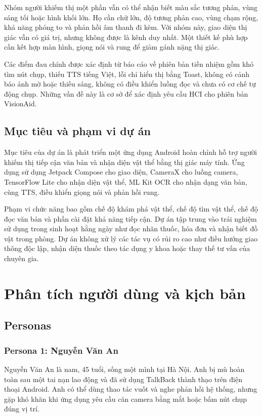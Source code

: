\documentclass[a4paper,13pt]{report}
\begin{document}
Nhóm người khiếm thị một phần vẫn có thể nhận biết màu sắc tương phản, vùng sáng tối hoặc hình khối lớn. Họ cần chữ lớn, độ tương phản cao, vùng chạm rộng, khả năng phóng to và phản hồi âm thanh đi kèm. Với nhóm này, giao diện thị giác vẫn có giá trị, nhưng không được là kênh duy nhất. Một thiết kế phù hợp cần kết hợp màn hình, giọng nói và rung để giảm gánh nặng thị giác.

Các điểm đau chính được xác định từ báo cáo về phiên bản tiền nhiệm gồm khó tìm nút chụp, thiếu TTS tiếng Việt, lỗi chỉ hiển thị bằng Toast, không có cảnh báo ảnh mờ hoặc thiếu sáng, không có điều khiển luồng đọc và chưa có cơ chế tự động chụp. Những vấn đề này là cơ sở để xác định yêu cầu HCI cho phiên bản VisionAid.

\section{Mục tiêu và phạm vi dự án}

Mục tiêu của dự án là phát triển một ứng dụng Android hoàn chỉnh hỗ trợ người khiếm thị tiếp cận văn bản và nhận diện vật thể bằng thị giác máy tính. Ứng dụng sử dụng Jetpack Compose cho giao diện, CameraX cho luồng camera, TensorFlow Lite cho nhận diện vật thể, ML Kit OCR cho nhận dạng văn bản, cùng TTS, điều khiển giọng nói và phản hồi rung.

Phạm vi chức năng bao gồm chế độ khám phá vật thể, chế độ tìm vật thể, chế độ đọc văn bản và phần cài đặt khả năng tiếp cận. Dự án tập trung vào trải nghiệm sử dụng trong sinh hoạt hằng ngày như đọc nhãn thuốc, hóa đơn và nhận biết đồ vật trong phòng. Dự án không xử lý các tác vụ có rủi ro cao như điều hướng giao thông độc lập, nhận diện thuốc theo tác dụng y khoa hoặc thay thế tư vấn của chuyên gia.

\chapter{Phân tích người dùng và kịch bản}

\section{Personas}

\subsection{Persona 1: Nguyễn Văn An}

Nguyễn Văn An là nam, 45 tuổi, sống một mình tại Hà Nội. Anh bị mù hoàn toàn sau một tai nạn lao động và đã sử dụng TalkBack thành thạo trên điện thoại Android. Anh có thể dùng thao tác vuốt và nghe phản hồi hệ thống, nhưng gặp khó khăn khi ứng dụng yêu cầu căn camera bằng mắt hoặc bấm nút chụp đúng vị trí.
\end{document}
